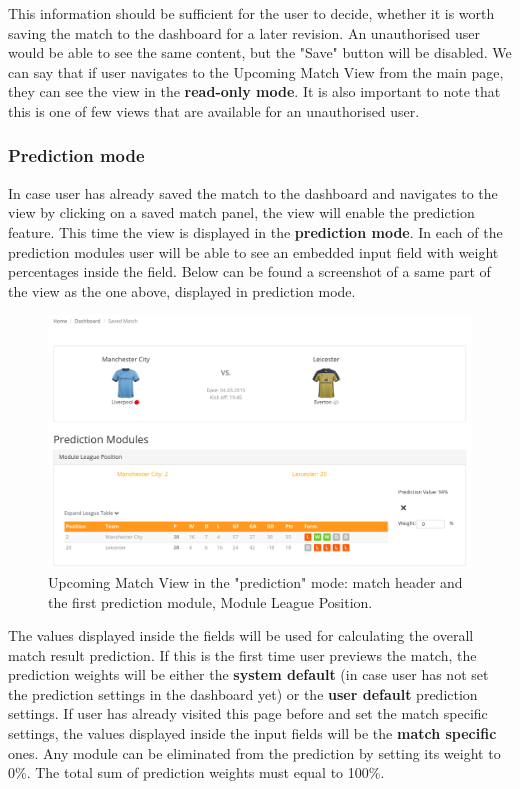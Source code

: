 This information should be sufficient for the user to decide, whether it is worth saving the match to the dashboard for a later revision. An unauthorised user would be able to see the same content, but the "Save" button will be disabled. We can say that if user navigates to the Upcoming Match View from the main page, they can see the view in the \textbf{read-only mode}. It is also important to note that this is one of few views that are available for an unauthorised user.

\subsubsection*{Prediction mode}
In case user has already saved the match to the dashboard and navigates to the view by clicking on a saved match panel, the view will enable the prediction feature. This time the view is displayed in the \textbf{prediction mode}. In each of the prediction modules user will be able to see an embedded input field with weight percentages inside the field. Below can be found a screenshot of a same part of the view as the one above, displayed in prediction mode.

\begin{figure}[H]
	\begin{center}
		\includegraphics[width=.90\textwidth]{impl/images/upcomingMatchViewSM}
		\caption{Upcoming Match View in the "prediction" mode: match header and the first prediction module, Module League Position.} 	  \label{fig:using:upcominmatchviewSM}
	\end{center}
\end{figure}

The values displayed inside the fields will be used for calculating the overall match result prediction. If this is the first time user previews the match, the prediction weights will be either the \textbf{system default} (in case user has not set the prediction settings in the dashboard yet) or the \textbf{user default} prediction settings. If user has already visited this page before and set the match specific settings, the values displayed inside the input fields will be the \textbf{match specific} ones. Any module can be eliminated from the prediction by setting its weight to 0\%. The total sum of prediction weights must equal to 100\%.

